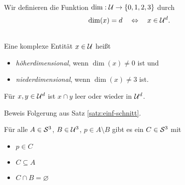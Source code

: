 \begin{dfn}\ \\
    Wir definieren die Funktion $\dim : \mathcal{U} \to \{0,1,2,3\}$ durch
    $$\dim(x) = d \quad \Leftrightarrow \quad x \in \mathcal{U}^d.$$
\end{dfn}

\begin{dfn}\ \\
    Eine komplexe Entität $x \in \mathcal{U}$ heißt
    \begin{itemize}
        \item \emph{höherdimensional}, wenn $\dim(x) \neq 0$ ist und
        \item \emph{niederdimensional}, wenn $\dim(x) \neq 3$ ist.
    \end{itemize}
\end{dfn}

\begin{satz}\label{satz:univ-schnitt}
    Für $x,y \in \mathcal{U}^d$ ist $x \cap y$ leer oder wieder in $\mathcal{U}^d$.
\end{satz}
Beweis Folgerung aus Satz \ref{satz:einf-schnitt}.

\begin{satz}\label{satz:strong-sup-pre}
    Für alle $A \in \mathcal{S}^3$, $B \in \mathcal{U}^3$, $p \in A \setminus B$ gibt es ein $C \in \mathcal{S}^3$ mit
    \begin{itemize}
        \item $p \in C$
        \item $C \subseteq A$
        \item $C \cap B = \varnothing$
    \end{itemize}
\end{satz}

